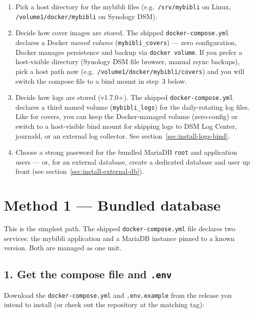 \begin{enumerate}
  \item Pick a host directory for the mybibli files
        (e.g.\ \texttt{/srv/mybibli} on Linux,
        \texttt{/volume1/docker/mybibli} on Synology DSM).
  \item Decide how cover images are stored.
        The shipped \texttt{docker-compose.yml} declares a Docker
        \emph{named volume} (\texttt{mybibli\_covers}) — zero
        configuration, Docker manages persistence and backup via
        \texttt{docker volume}. If you prefer a host-visible directory
        (Synology DSM file browser, manual rsync backups), pick a host
        path now (e.g.\ \texttt{/volume1/docker/mybibli/covers}) and
        you will switch the compose file to a bind mount in step~3
        below.
  \item Decide how logs are stored (v1.7.0+).
        The shipped \texttt{docker-compose.yml} declares a third
        named volume (\texttt{mybibli\_logs}) for the daily-rotating
        log files. Like for covers, you can keep the Docker-managed
        volume (zero-config) or switch to a host-visible bind mount
        for shipping logs to DSM Log Center, journald, or an external
        log collector. See section~\ref{sec:install-logs-bind}.
  \item Choose a strong password for the bundled MariaDB
        \texttt{root} and application users — or, for an external
        database, create a dedicated database and user up front (see
        section~\ref{sec:install-external-db}).
\end{enumerate}

\section{Method 1 — Bundled database}\label{sec:install-bundled}

This is the simplest path. The shipped \texttt{docker-compose.yml}
file declares two services: the mybibli application and a MariaDB
instance pinned to a known version. Both are managed as one unit.

\subsection*{1. Get the compose file and \texttt{.env}}

Download the \texttt{docker-compose.yml} and \texttt{.env.example}
from the release you intend to install (or check out the repository
at the matching tag):


